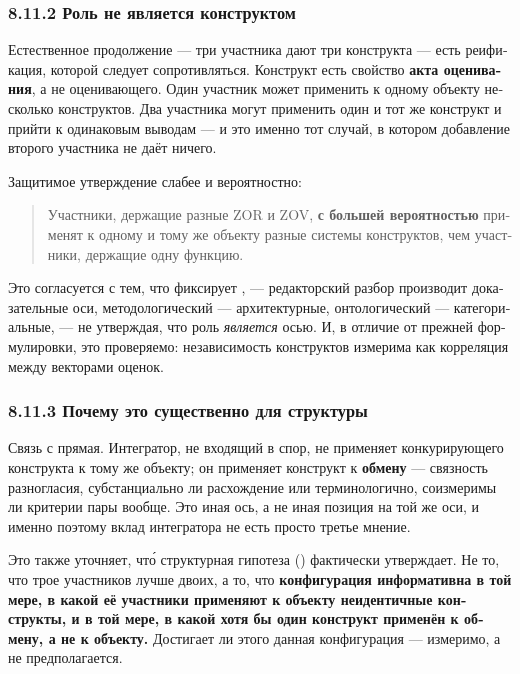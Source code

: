 \begin{russian}
\subsubsection*{8.11.2 Роль не является конструктом}
\label{sec:ru:8.11.2}

Естественное продолжение — три участника дают три конструкта — есть реификация, которой следует сопротивляться. Конструкт есть свойство \textbf{акта оценивания}, а не оценивающего. Один участник может применить к одному объекту несколько конструктов. Два участника могут применить один и тот же конструкт и прийти к одинаковым выводам — и это именно тот случай, в котором добавление второго участника не даёт ничего.

Защитимое утверждение слабее и вероятностно:

\begin{quote}
Участники, держащие разные ZOR и ZOV, \textbf{с большей вероятностью} применят к одному и тому же объекту разные системы конструктов, чем участники, держащие одну функцию.
\end{quote}
Это согласуется с тем, что фиксирует , — редакторский разбор производит доказательные оси, методологический — архитектурные, онтологический — категориальные, — не утверждая, что роль \emph{является} осью. И, в отличие от прежней формулировки, это проверяемо: независимость конструктов измерима как корреляция между векторами оценок.


\subsubsection*{8.11.3 Почему это существенно для структуры}
\label{sec:ru:8.11.3}

Связь с  прямая. Интегратор, не входящий в спор, не применяет конкурирующего конструкта к тому же объекту; он применяет конструкт к \textbf{обмену} — связность разногласия, субстанциально ли расхождение или терминологично, соизмеримы ли критерии пары вообще. Это иная ось, а не иная позиция на той же оси, и именно поэтому вклад интегратора не есть просто третье мнение.

Это также уточняет, что́ структурная гипотеза () фактически утверждает. Не то, что трое участников лучше двоих, а то, что \textbf{конфигурация информативна в той мере, в какой её участники применяют к объекту неидентичные конструкты, и в той мере, в какой хотя бы один конструкт применён к обмену, а не к объекту.} Достигает ли этого данная конфигурация — измеримо, а не предполагается.



\end{russian}
